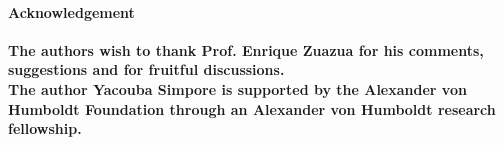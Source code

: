 \documentclass[10pt, a4paper]{amsart}
\theoremstyle{plain}
\theoremstyle{definition}
\theoremstyle{remark}
\numberwithin{equation}{section}
\begin{document}
\paragraph{\bf Acknowledgement}
\textbf{The authors wish to thank Prof. Enrique Zuazua  for his comments, suggestions and for fruitful discussions.}\\
\textbf{The author Yacouba Simpore is supported by the Alexander von Humboldt Foundation through an Alexander von Humboldt research fellowship.}

 
 \vfill 
\end{document}
